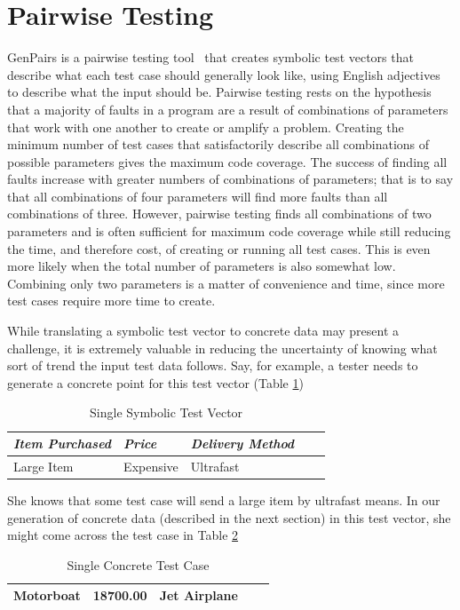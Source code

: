 \section{Pairwise Testing}
GenPairs is a pairwise testing tool~\cite{Gen:Pairs} that creates symbolic test vectors that describe what each test case should generally look like, using English adjectives to describe what the input should be. Pairwise testing rests on the hypothesis that a majority of faults in a program are a result of combinations of parameters that work with one another to create or amplify a problem. Creating the minimum number of test cases that satisfactorily describe all combinations of possible parameters gives the maximum code coverage. The success of finding all faults increase with greater numbers of combinations of parameters; that is to say that all combinations of four parameters will find more faults than all combinations of three. However, pairwise testing finds all combinations of two parameters and is often sufficient for maximum code coverage while still reducing the time, and therefore cost, of creating or running all test cases. This is even more likely when the total number of parameters is also somewhat low. Combining only two parameters is a matter of convenience and time, since more test cases require more time to create.

While translating a symbolic test vector to concrete data may present a challenge, it is extremely valuable in reducing the uncertainty of knowing what sort of trend the input test data follows. Say, for example, a tester needs to generate a concrete point for this test vector (Table \ref{table:testv})

\begin{table}[h!]
\centering
\begin{tabular}{@{} *5l @{}}    \toprule
\emph{Item Purchased} & \emph{Price} & \emph{Delivery Method}  \\\midrule
Large Item & Expensive & Ultrafast \\\bottomrule
 \hline
\end{tabular}
\caption{Single Symbolic Test Vector}
\label{table:testv}
\end{table}

She knows that some test case will send a large item by ultrafast means. In our generation of concrete data (described in the next section) in this test vector, she might come across the test case in Table \ref{table:conctc}

\begin{table}[h!]
\centering
\begin{tabular}{@{} *5l @{}}    \toprule
Motorboat & 18700.00 & Jet Airplane \\\bottomrule
 \hline
\end{tabular}
\caption{Single Concrete Test Case}
\label{table:conctc}
\end{table}

